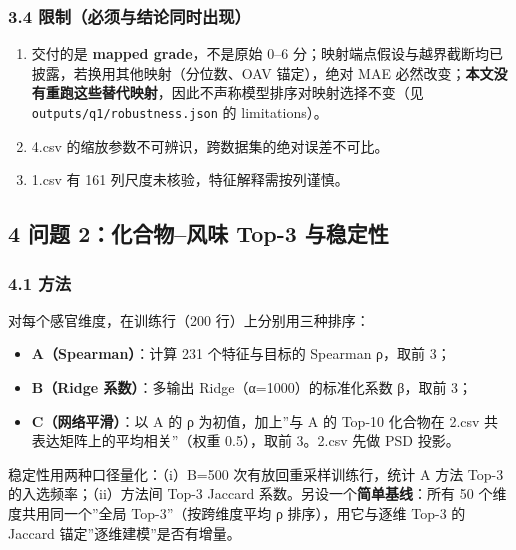 \documentclass[
  UTF8]{ctexart}
\providecommand{\tightlist}{%
  \setlength{\itemsep}{0pt}\setlength{\parskip}{0pt}}
\begin{document}
\subsubsection{3.4
限制（必须与结论同时出现）}\label{ux9650ux5236ux5fc5ux987bux4e0eux7ed3ux8bbaux540cux65f6ux51faux73b0}

\begin{enumerate}
\def\labelenumi{\arabic{enumi}.}
\tightlist
\item
  交付的是 \textbf{mapped grade}，不是原始 0--6
  分；映射端点假设与越界截断均已披露，若换用其他映射（分位数、OAV
  锚定），绝对 MAE
  必然改变；\textbf{本文没有重跑这些替代映射}，因此不声称模型排序对映射选择不变（见
  \texttt{outputs/q1/robustness.json} 的 limitations）。
\item
  4.csv 的缩放参数不可辨识，跨数据集的绝对误差不可比。
\item
  1.csv 有 161 列尺度未核验，特征解释需按列谨慎。
\end{enumerate}

\subsection{4 问题 2：化合物--风味 Top-3
与稳定性}\label{ux95eeux9898-2ux5316ux5408ux7269ux98ceux5473-top-3-ux4e0eux7a33ux5b9aux6027}

\subsubsection{4.1 方法}\label{ux65b9ux6cd5}

对每个感官维度，在训练行（200 行）上分别用三种排序：

\begin{itemize}
\tightlist
\item
  \textbf{A（Spearman）}：计算 231 个特征与目标的 Spearman
  \textbar ρ\textbar，取前 3；
\item
  \textbf{B（Ridge 系数）}：多输出 Ridge（α=1000）的标准化系数
  \textbar β\textbar，取前 3；
\item
  \textbf{C（网络平滑）}：以 A 的 \textbar ρ\textbar{} 为初值，加上''与
  A 的 Top-10 化合物在 2.csv 共表达矩阵上的平均相关''（权重 0.5），取前
  3。2.csv 先做 PSD 投影。
\end{itemize}

稳定性用两种口径量化：（i）B=500 次有放回重采样训练行，统计 A 方法 Top-3
的入选频率；（ii）方法间 Top-3 Jaccard
系数。另设一个\textbf{简单基线}：所有 50 个维度共用同一个''全局
Top-3''（按跨维度平均 \textbar ρ\textbar{} 排序），用它与逐维 Top-3 的
Jaccard 锚定''逐维建模''是否有增量。
\end{document}
